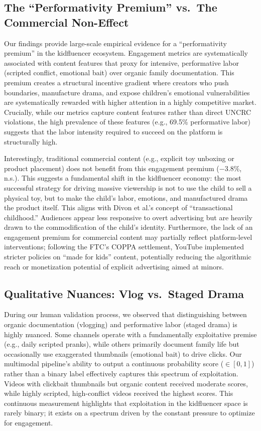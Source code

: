 \documentclass[letterpaper]{article} %
\begin{document}
\subsection{The ``Performativity Premium'' vs.\ The Commercial Non-Effect}

Our findings provide large-scale empirical evidence for a ``performativity premium'' in the kidfluencer ecosystem. Engagement metrics are systematically associated with content features that proxy for intensive, performative labor (scripted conflict, emotional bait) over organic family documentation. This premium creates a structural incentive gradient where creators who push boundaries, manufacture drama, and expose children's emotional vulnerabilities are systematically rewarded with higher attention in a highly competitive market. Crucially, while our metrics capture content features rather than direct UNCRC violations, the high prevalence of these features (e.g., 69.5\% performative labor) suggests that the labor intensity required to succeed on the platform is structurally high.

Interestingly, traditional commercial content (e.g., explicit toy unboxing or product placement) does not benefit from this engagement premium ($-3.8\%$, n.s.). This suggests a fundamental shift in the kidfluencer economy: the most successful strategy for driving massive viewership is not to use the child to sell a physical toy, but to make the child's labor, emotions, and manufactured drama the product itself. This aligns with Divon et al.'s \citep{divon2025children} concept of ``transactional childhood.'' Audiences appear less responsive to overt advertising but are heavily drawn to the commodification of the child's identity. Furthermore, the lack of an engagement premium for commercial content may partially reflect platform-level interventions; following the FTC's COPPA settlement, YouTube implemented stricter policies on ``made for kids'' content, potentially reducing the algorithmic reach or monetization potential of explicit advertising aimed at minors. 

\subsection{Qualitative Nuances: Vlog vs.\ Staged Drama}

During our human validation process, we observed that distinguishing between organic documentation (vlogging) and performative labor (staged drama) is highly nuanced. Some channels operate with a fundamentally exploitative premise (e.g., daily scripted pranks), while others primarily document family life but occasionally use exaggerated thumbnails (emotional bait) to drive clicks. Our multimodal pipeline's ability to output a continuous probability score ($\in [0, 1]$) rather than a binary label effectively captures this spectrum of exploitation. Videos with clickbait thumbnails but organic content received moderate scores, while highly scripted, high-conflict videos received the highest scores. This continuous measurement highlights that exploitation in the kidfluencer space is rarely binary; it exists on a spectrum driven by the constant pressure to optimize for engagement.
\end{document}
